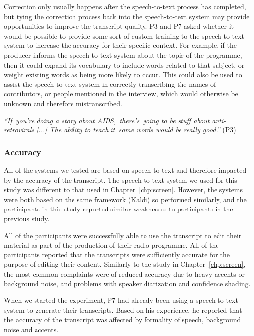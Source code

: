 
Correction only usually happens after the speech-to-text process has completed, but tying the correction process back
into the speech-to-text system may provide opportunities to improve the transcript quality.  P3 and P7 asked whether it
would be possible to provide some sort of custom training to the speech-to-text system to increase the accuracy for
their specific context. For example, if the producer informs the speech-to-text system about the topic of the
programme, then it could expand its vocabulary to include words related to that subject, or weight existing words as
being more likely to occur. This could also be used to assist the speech-to-text system in correctly transcribing the
names of contributors, or people mentioned in the interview, which would otherwise be unknown and therefore
mistranscribed.

\textit{``If you're doing a story about AIDS, there's going to be stuff about anti-retrovirals [...]
  The ability to teach it some words would be really good.''} (P3)

\subsubsection{Accuracy}

All of the systems we tested are based on speech-to-text and therefore impacted by the accuracy of the transcript.  The
speech-to-text system we used for this study was different to that used in Chapter~\ref{chp:screen}.  However, the
systems were both based on the same framework (Kaldi) so performed similarly, and the participants in this study
reported similar weaknesses to participants in the previous study.

All of the participants were successfully able to use the transcript to edit their material as part of the production
of their radio programme. All of the participants reported that the transcripts were sufficiently accurate for the
purpose of editing their content. Similarly to the study in Chapter~\ref{chp:screen}, the most common complaints were
of reduced accuracy due to heavy accents or background noise, and problems with speaker diarization and confidence
shading.

When we started the experiment, P7 had already been using a speech-to-text system to generate their transcripts. Based
on his experience, he reported that the accuracy of the transcript was affected by formality of speech, background
noise and accents.


